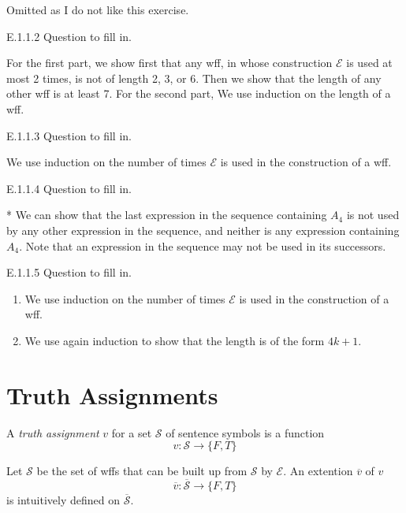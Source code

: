 Omitted as I do not like this exercise.

\begin{exercise}{E.1.1.2}
  Question to fill in.
\end{exercise}

For the first part, we show first that any wff, in whose construction $\mathcal{E}$ is used at most 2 times, is not of length 2, 3, or 6. Then we show that the length of any other wff is at least 7. For the second part, We use induction on the length of a wff.

\begin{exercise}{E.1.1.3}
  Question to fill in.
\end{exercise}

We use induction on the number of times $\mathcal{E}$ is used in the construction of a wff.

\begin{exercise}{E.1.1.4}
  Question to fill in.
\end{exercise}

* We can show that the last expression in the sequence containing $A_4$ is not used by any other expression in the sequence, and neither is any expression containing $A_4$. Note that an expression in the sequence may not be used in its successors.

\begin{exercise}{E.1.1.5}
  Question to fill in.
\end{exercise}

\begin{enumerate}
  \item We use induction on the number of times $\mathcal{E}$ is used in the construction of a wff.
  \item We use again induction to show that the length is of the form $4k+1$.
\end{enumerate}

\section{Truth Assignments}

A \textit{truth assignment} $v$ for a set $\mathcal{S}$ of sentence symbols is a function
\[
  v:\mathcal{S}\rightarrow\{F,T\}
\]

Let $\mathcal{S}$ be the set of wffs that can be built up from $\mathcal{S}$ by $\mathcal{E}$. An extention $\overline{v}$ of $v$
\[
  \overline{v}:\overline{\mathcal{S}}\rightarrow\{F,T\}
\]
is intuitively defined on $\overline{\mathcal{S}}$.

